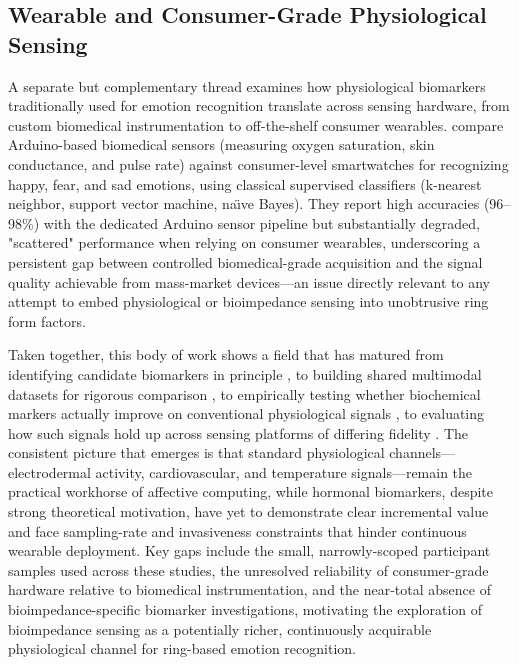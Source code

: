 \subsection{Wearable and Consumer-Grade Physiological Sensing}
A separate but complementary thread examines how physiological biomarkers traditionally used for emotion recognition translate across sensing hardware, from custom biomedical instrumentation to off-the-shelf consumer wearables. \cite{shahid2026comparative} compare Arduino-based biomedical sensors (measuring oxygen saturation, skin conductance, and pulse rate) against consumer-level smartwatches for recognizing happy, fear, and sad emotions, using classical supervised classifiers (k-nearest neighbor, support vector machine, na{\"\i}ve Bayes). They report high accuracies (96--98\%) with the dedicated Arduino sensor pipeline but substantially degraded, "scattered" performance when relying on consumer wearables, underscoring a persistent gap between controlled biomedical-grade acquisition and the signal quality achievable from mass-market devices---an issue directly relevant to any attempt to embed physiological or bioimpedance sensing into unobtrusive ring form factors.

Taken together, this body of work shows a field that has matured from identifying candidate biomarkers in principle \cite{zamkah2020identification}, to building shared multimodal datasets for rigorous comparison \cite{a2022wemac}, to empirically testing whether biochemical markers actually improve on conventional physiological signals \cite{gutierrezmartin2022fear,qu2024advancing,qu2024student}, to evaluating how such signals hold up across sensing platforms of differing fidelity \cite{shahid2026comparative}. The consistent picture that emerges is that standard physiological channels---electrodermal activity, cardiovascular, and temperature signals---remain the practical workhorse of affective computing, while hormonal biomarkers, despite strong theoretical motivation, have yet to demonstrate clear incremental value and face sampling-rate and invasiveness constraints that hinder continuous wearable deployment. Key gaps include the small, narrowly-scoped participant samples used across these studies, the unresolved reliability of consumer-grade hardware relative to biomedical instrumentation, and the near-total absence of bioimpedance-specific biomarker investigations, motivating the exploration of bioimpedance sensing as a potentially richer, continuously acquirable physiological channel for ring-based emotion recognition.

